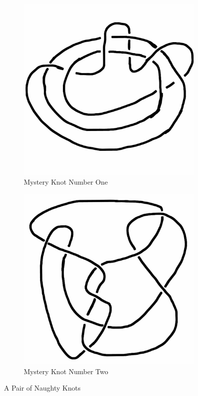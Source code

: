 \documentclass[12pt,letterpaper]{article}
\theoremstyle{definition}
\begin{document}
\begin{figure}[h]
    \centering
    \begin{subfigure}[b]{0.4\textwidth}
        \centering
        \includegraphics[width=\textwidth]{knotpics/perko1.png}
        \caption{Mystery Knot Number One}
    \end{subfigure}
    \hspace{1cm}
    \begin{subfigure}[b]{0.4\textwidth}
        \centering
        \includegraphics[width=\textwidth]{knotpics/perko2.png}
        \caption{Mystery Knot Number Two}
    \end{subfigure}
    \caption{A Pair of Naughty Knots}
\end{figure}
\end{document}
